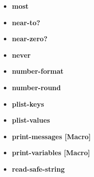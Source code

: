 \documentclass [11pt]{book}
\begin{document}
\begin{itemize}
\item {}
\label{prim:most}
\textbf{most}





\item {}
\label{prim:near-to?}
\textbf{near-to?}





\item {}
\label{prim:near-zero?}
\textbf{near-zero?}





\item {}
\label{prim:never}
\textbf{never}





\item {}
\label{prim:number-format}
\textbf{number-format}





\item {}
\label{prim:number-round}
\textbf{number-round}





\item {}
\label{prim:plist-keys}
\textbf{plist-keys}





\item {}
\label{prim:plist-values}
\textbf{plist-values}





\item {}
\label{prim:print-messages}
\textbf{print-messages [Macro]}





\item {}
\label{prim:print-variables}
\textbf{print-variables [Macro]}





\item {}
\label{prim:read-safe-string}
\textbf{read-safe-string}






\end{itemize}
\end{document}
